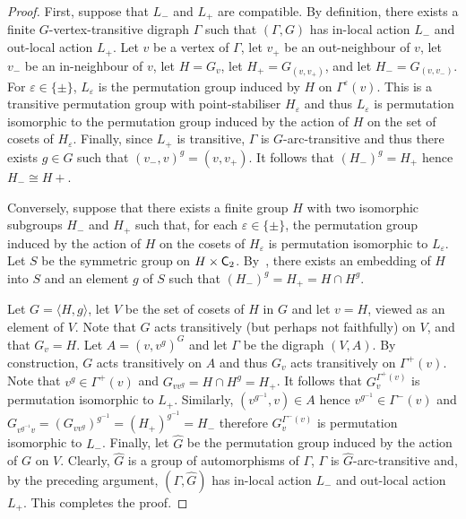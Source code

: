 \documentclass[twoside,12pt,leqno]{amsproc}
\numberwithin{table}{section}
\numberwithin{figure}{section}
\theoremstyle{plain}
\theoremstyle{definition}\newtheorem{definition}[theorem]{Definition}
\theoremstyle{definition}\newtheorem{example}[theorem]{Example}
\theoremstyle{definition}\newtheorem{construction}[theorem]{Construction}
\theoremstyle{definition}\newtheorem{remark}[theorem]{Remark}
\theoremstyle{definition}\newtheorem{problem}[theorem]{Problem}
\begin{document}
\begin{proof}
First, suppose that $L_-$ and $L_+$ are compatible. By definition,  there exists a finite $G$-vertex-transitive digraph $\Gamma$ such that $(\Gamma,G)$ has in-local action $L_-$ and out-local action $L_+$. Let $v$ be a vertex of $\Gamma$, let $v_+$ be an out-neighbour of $v$, let $v_-$ be an in-neighbour of $v$, let $H=G_v$, let $H_+=G_{(v,v_+)}$, and let $H_-=G_{(v,v_-)}$. For ${\varepsilon}\in\{\pm\}$, $L_{\varepsilon}$ is the permutation group induced by $H$ on  $\Gamma^{\varepsilon}(v)$. This is a transitive permutation group with point-stabiliser $H_{\varepsilon}$ and thus $L_{\varepsilon}$ is permutation isomorphic to the permutation group induced by the action of $H$ on the set of cosets of $H_{\varepsilon}$. Finally, since $L_+$ is transitive, $\Gamma$ is $G$-arc-transitive and thus there exists $g\in G$ such that $(v_-,v)^g=(v,v_+)$. It follows that $(H_-)^g=H_+$ hence $H_-\cong H+$. 

Conversely, suppose that there exists a finite group $H$ with two isomorphic subgroups $H_-$ and $H_+$ such that, for each ${\varepsilon}\in\{\pm\}$, the permutation group induced by the action of $H$ on the cosets of $H_{\varepsilon}$ is permutation isomorphic to $L_{\varepsilon}$. Let $S$ be the symmetric group on $H\times{\textup{\textsf{C}}}_2$.  By~\cite[Lemma 2.3]{Glaub}, there exists an embedding of $H$ into $S$ and an element $g$ of $S$ such that $(H_-)^g=H_+=H\cap H^g$. 

Let $G=\langle H,g\rangle$, let $V$ be the set of cosets of $H$ in $G$ and let $v=H$, viewed as an element of $V$. Note that $G$ acts transitively (but perhaps not faithfully) on $V$, and that $G_v=H$.  Let $A=(v,v^g)^{G}$ and let $\Gamma$ be the digraph $(V,A)$. By construction, $G$ acts transitively on $A$ and thus $G_v$ acts transitively on $\Gamma^+(v)$. Note that $v^g\in \Gamma^+(v)$ and  $G_{vv^g}=H\cap H^g=H_+$. It follows that $G_v^{\Gamma^+(v)}$ is permutation isomorphic to $L_+$. Similarly, $(v^{g^{-1}},v)\in A$ hence $v^{g^{-1}}\in \Gamma^-(v)$ and $G_{v^{g^{-1}}v}=(G_{vv^g})^{g^{-1}}=(H_+)^{g^{-1}}=H_-$ therefore $G_v^{\Gamma^-(v)}$ is permutation isomorphic to $L_-$. Finally, let $\widehat{G}$ be the permutation group induced by the action of $G$ on $V$. Clearly, $\widehat{G}$ is a group of automorphisms of $\Gamma$, $\Gamma$ is $\widehat{G}$-arc-transitive and, by the preceding argument, $(\Gamma,\widehat{G})$ has in-local action $L_-$ and out-local action $L_+$. This completes the proof.
\end{proof}
\end{document}
